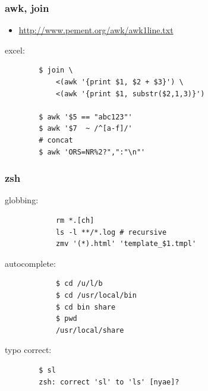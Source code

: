\documentclass[hyperref={unicode=true}]{beamer}
\begin{document}
\begin{frame}[fragile]
    \frametitle{awk, join}
	\begin{itemize}
        \item \url{http://www.pement.org/awk/awk1line.txt}
	\end{itemize}
    excel:
	\begin{addmargin}[1em]{0em}
		\begin{verbatim}
        $ join \
            <(awk '{print $1, $2 + $3}') \
            <(awk '{print $1, substr($2,1,3)}')

        $ awk '$5 == "abc123"'
        $ awk '$7  ~ /^[a-f]/'
        # concat
        $ awk 'ORS=NR%2?",":"\n"'
		\end{verbatim}
	\end{addmargin}
\end{frame}

\begin{frame}[fragile]
	\frametitle{zsh}

	globbing:
	\begin{addmargin}[1em]{0em}
		\begin{verbatim}
			rm *.[ch]
			ls -l **/*.log # recursive
			zmv '(*).html' 'template_$1.tmpl'
		\end{verbatim}
	\end{addmargin}

	autocomplete:
	\begin{addmargin}[1em]{0em}
		\begin{verbatim}
			$ cd /u/l/b
			$ cd /usr/local/bin
			$ cd bin share
			$ pwd
			/usr/local/share
		\end{verbatim}
	\end{addmargin}

	typo correct:
	\begin{addmargin}[1em]{0em}
		\begin{verbatim}
		$ sl
		zsh: correct 'sl' to 'ls' [nyae]?
		\end{verbatim}
	\end{addmargin}
\end{frame}
\end{document}
